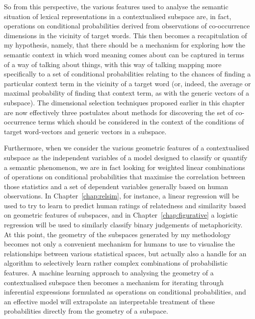 \noindent So from this perspective, the various features used to analyse the semantic situation of lexical representations in a contextualised subspace are, in fact, operations on conditional probabilities derived from observations of co-occurrence dimensions in the vicinity of target words.  This then becomes a recapitulation of my hypothesis, namely, that there should be a mechanism for exploring how the semantic context in which word meaning comes about can be captured in terms of a way of talking about things, with this way of talking mapping more specifically to a set of conditional probabilities relating to the chances of finding a particular context term in the vicinity of a target word (or, indeed, the average or maximal probability of finding that context term, as with the generic vectors of a subspace).  The dimensional selection techniques proposed earlier in this chapter are now effectively three postulates about methods for discovering the set of co-occurrence terms which should be considered in the context of the conditions of target word-vectors and generic vectors in a subspace.

Furthermore, when we consider the various geometric features of a contextualised subspace as the independent variables of a model designed to classify or quantify a semantic phenomenon, we are in fact looking for weighted linear combinations of operations on conditional probabilities that maximise the correlation between those statistics and a set of dependent variables generally based on human observations.  In Chapter~\ref{chap:relsim}, for instance, a linear regression will be used to try to learn to predict human ratings of relatedness and similarity based on geometric features of subspaces, and in Chapter~\ref{chap:figurative} a logistic regression will be used to similarly classify binary judgements of metaphoricity.  At this point, the geometry of the subspaces generated by my methodology becomes not only a convenient mechanism for humans to use to visualise the relationships between various statistical spaces, but actually also a handle for an algorithm to selectively learn rather complex combinations of probabilistic features.  A machine learning approach to analysing the geometry of a contextualised subspace then becomes a mechanism for iterating through inferential expressions formulated as operations on conditional probabilities, and an effective model will extrapolate an interpretable treatment of these probabilities directly from the geometry of a subspace.

